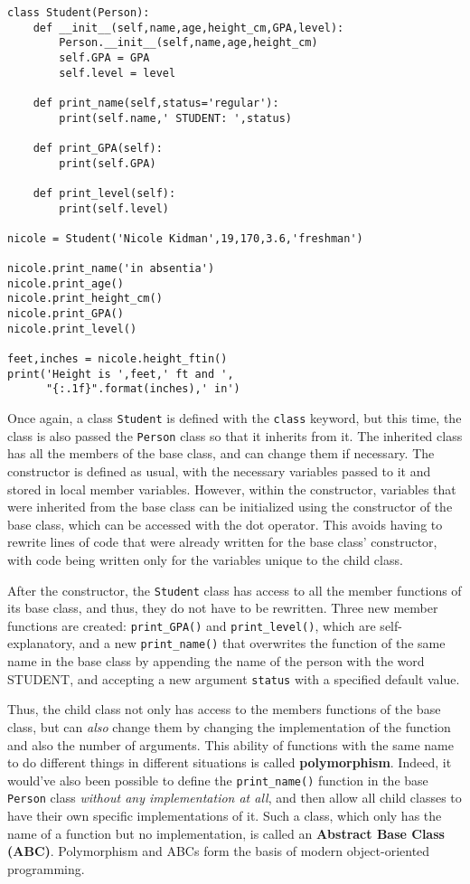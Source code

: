 \documentclass[12pt]{article}
\newcommand{\code}{\texttt}
\begin{document}
\begin{lstlisting}[frame=single] 
class Student(Person):
    def __init__(self,name,age,height_cm,GPA,level):
        Person.__init__(self,name,age,height_cm)
        self.GPA = GPA
        self.level = level
    
    def print_name(self,status='regular'):
        print(self.name,' STUDENT: ',status)
    
    def print_GPA(self):
        print(self.GPA)
    
    def print_level(self):
        print(self.level)

nicole = Student('Nicole Kidman',19,170,3.6,'freshman')

nicole.print_name('in absentia')
nicole.print_age()
nicole.print_height_cm()
nicole.print_GPA()
nicole.print_level()

feet,inches = nicole.height_ftin()
print('Height is ',feet,' ft and ',
      "{:.1f}".format(inches),' in')
\end{lstlisting}

Once again, a class \code{Student} is defined with the \code{class} keyword, but this time, the class is also passed the \code{Person} class so that it inherits from it. The inherited class has all the members of the base class, and can change them if necessary. The constructor is defined as usual, with the necessary variables passed to it and stored in local member variables. However, within the constructor, variables that were inherited from the base class can be initialized using the constructor of the base class, which can be accessed with the dot operator. This avoids having to rewrite lines of code that were already written for the base class' constructor, with code being written only for the variables unique to the child class.

After the constructor, the \code{Student} class has access to all the member functions of its base class, and thus, they do not have to be rewritten. Three new member functions are created: \code{print\_GPA()} and \code{print\_level()}, which are self-explanatory, and a new \code{print\_name()} that overwrites the function of the same name in the base class by appending the name of the person with the word STUDENT, and accepting a new argument \code{status} with a specified default value. 

Thus, the child class not only has access to the members functions of the base class, but can \textit{also} change them by changing the implementation of the function and also the number of arguments. This ability of functions with the same name to do different things in different situations is called \textbf{polymorphism}. Indeed, it would've also been possible to define the \code{print\_name()} function in the base \code{Person} class \textit{without any implementation at all}, and then allow all child classes to have their own specific implementations of it. Such a class, which only has the name of a function but no implementation, is called an \textbf{Abstract Base Class (ABC)}. Polymorphism and ABCs form the basis of modern object-oriented programming.
\end{document}
